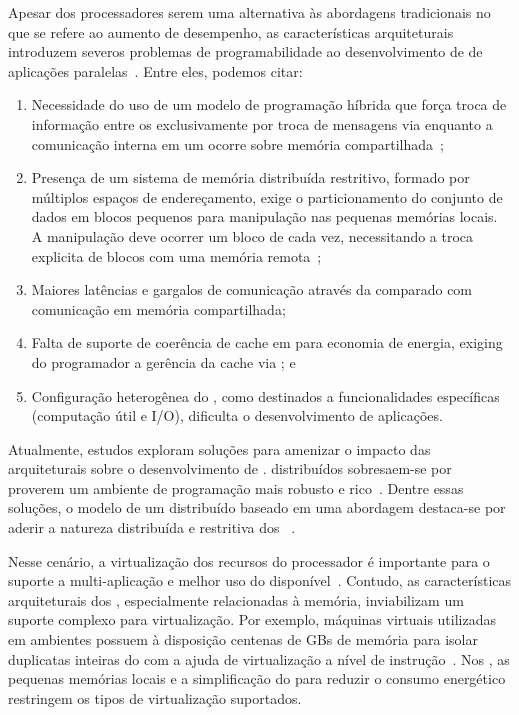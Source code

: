 Apesar dos processadores \lw serem uma alternativa às abordagens tradicionais no que se refere ao aumento de desempenho, as características arquiteturais introduzem severos problemas de programabilidade ao desenvolvimento de \software de aplicações paralelas~\cite{Castro-PARCO:2016}. Entre eles, podemos citar:

\begin{enumerate}[label= (\roman*)]
    \item Necessidade do uso de um modelo de programação híbrida que força troca de informação entre os \clusters exclusivamente por troca de mensagens via \noc enquanto a comunicação interna em um \cluster ocorre sobre memória compartilhada~\cite{kelly2013};
    \item Presença de um sistema de memória distribuída restritivo, formado por múltiplos espaços de endereçamento, exige o particionamento do conjunto de dados em blocos pequenos para manipulação nas pequenas memórias locais. A manipulação deve ocorrer um bloco de cada vez, necessitando a troca explicita de blocos com uma memória remota~\cite{Castro-PARCO:2016};
    \item Maiores latências e gargalos de comunicação através da \noc comparado com comunicação em memória compartilhada;
    \item Falta de suporte de coerência de cache em \hardware para economia de energia, exiging do programador a gerência da cache via \software; e
    \item Configuração heterogênea do \hardware, como \clusters destinados a funcionalidades específicas (computação útil e I/O), dificulta o desenvolvimento de aplicações.
\end{enumerate}

Atualmente, estudos exploram soluções para amenizar o impacto das arquiteturais sobre o desenvolvimento de \software. \oss distribuídos sobresaem-se por proverem um ambiente de programação mais robusto e rico~\cite{asmussen_m3:_2016, kluge_operating_2014, penna:sbesc19}. Dentre essas soluções, o modelo de um \os distribuído baseado em uma abordagem \multikernel destaca-se por aderir a natureza distribuída e restritiva dos \lws~\cite{penna2017-1,penna2017-2,penna2019}.

Nesse cenário, a virtualização dos recursos do processador é importante para o suporte a multi-aplicação e melhor uso do \hardware disponível~\cite{vanz2022virtualizaccao}. Contudo, as características arquiteturais dos \lws, especialmente relacionadas à memória, inviabilizam um suporte complexo para virtualização. Por exemplo, máquinas virtuais utilizadas em ambientes \cloud possuem à disposição centenas de GBs de memória para isolar duplicatas inteiras do \os com a ajuda de virtualização a nível de instrução~\cite{sharma2016containers}. Nos \lws, as pequenas memórias locais e a simplificação do \hardware para reduzir o consumo energético restringem os tipos de virtualização suportados.

